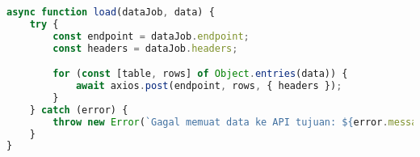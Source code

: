 \begin{lstlisting}[language=Javascript,caption={Load Data}]
async function load(dataJob, data) {
	try {
		const endpoint = dataJob.endpoint;
		const headers = dataJob.headers;

		for (const [table, rows] of Object.entries(data)) {
			await axios.post(endpoint, rows, { headers });
		}
	} catch (error) {
		throw new Error(`Gagal memuat data ke API tujuan: ${error.message}`);
	}
}
\end{lstlisting}